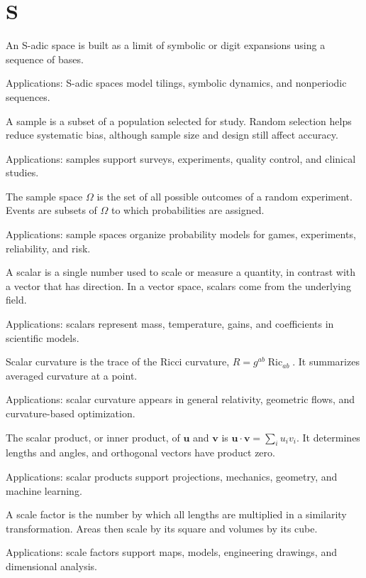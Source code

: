 \chapter*{S}
\label{chap:s}

An S-adic space is built as a limit of symbolic or digit expansions using a sequence of bases. \par\noindent Applications: S-adic spaces model tilings, symbolic dynamics, and nonperiodic sequences.

A sample is a subset of a population selected for study. Random selection helps reduce systematic bias, although sample size and design still affect accuracy. \par\noindent Applications: samples support surveys, experiments, quality control, and clinical studies.

The sample space $\Omega$ is the set of all possible outcomes of a random experiment. Events are subsets of $\Omega$ to which probabilities are assigned. \par\noindent Applications: sample spaces organize probability models for games, experiments, reliability, and risk.

A scalar is a single number used to scale or measure a quantity, in contrast with a vector that has direction. In a vector space, scalars come from the underlying field. \par\noindent Applications: scalars represent mass, temperature, gains, and coefficients in scientific models.

Scalar curvature is the trace of the Ricci curvature, $R=g^{ab}\operatorname{Ric}_{ab}$. It summarizes averaged curvature at a point. \par\noindent Applications: scalar curvature appears in general relativity, geometric flows, and curvature-based optimization.

The scalar product, or inner product, of $\mathbf u$ and $\mathbf v$ is $\mathbf u\cdot\mathbf v=\sum_i u_iv_i$. It determines lengths and angles, and orthogonal vectors have product zero. \par\noindent Applications: scalar products support projections, mechanics, geometry, and machine learning.

A scale factor is the number by which all lengths are multiplied in a similarity transformation. Areas then scale by its square and volumes by its cube. \par\noindent Applications: scale factors support maps, models, engineering drawings, and dimensional analysis.

